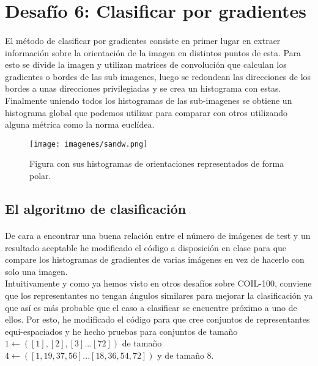 \documentclass[es,gi]{ifirak}\usepackage[]{graphicx}\usepackage[]{color}
\begin{document}
\pagebreak

\section{Desafío 6: Clasificar por gradientes}
\paragraph{} El método de clasificar por gradientes consiste en primer lugar en extraer información sobre la orientación de la imagen en distintos puntos de esta. Para esto se divide la imagen y utilizan matrices de convolución que calculan los gradientes o bordes de las sub imagenes, luego se redondean las direcciones de los bordes a unas direcciones privilegiadas y se crea un histograma con estas. Finalmente uniendo todos los histogramas de las sub-imagenes se obtiene un histograma global que podemos utilizar para comparar con otros utilizando alguna métrica como la norma euclídea.\\


\begin{figure}[hbtp]
\centering
\texttt{[image: imagenes/sandw.png]}
\caption{Figura con sus histogramas de orientaciones representados de forma polar.}
\end{figure}

\pagebreak
\subsection{El algoritmo de clasificación}
\paragraph{} De cara a encontrar una buena relación entre el número de imágenes de test y un resultado aceptable he modificado el código a disposición en clase para que compare los histogramas de gradientes de varias imágenes en vez de hacerlo con solo una imagen.\\

Intuitivamente y como ya hemos visto en otros desafíos sobre COIL-100, conviene que los representantes no tengan ángulos similares para mejorar la clasificación ya que así es más probable que el caso a clasificar se encuentre próximo a uno de ellos. Por esto, he modificado el código para que cree conjuntos de representantes equi-espaciados y he hecho pruebas para conjuntos de tamaño $1 \leftarrow ([1],[2],[3]...[72])$ de tamaño $4 \leftarrow ([1,19,37,56]...[18,36,54,72])$ y de tamaño 8.\\
\end{document}
